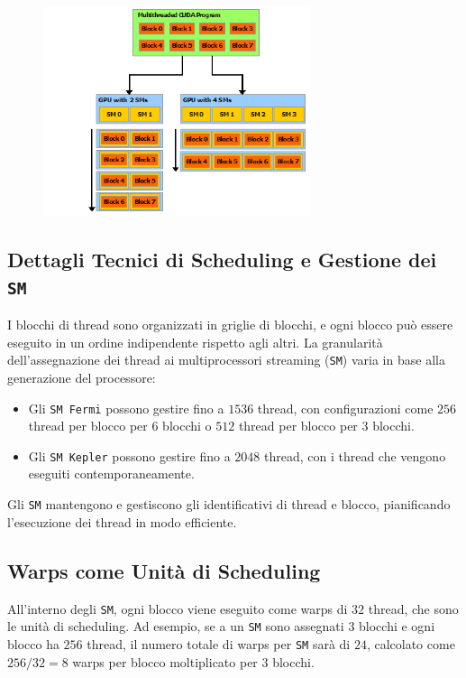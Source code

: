 \begin{figure}[H]
  \centering
  \includegraphics[width=0.7\textwidth]{img/transparent_scalability.png}
\end{figure}

\subsection{Dettagli Tecnici di Scheduling e Gestione dei \texttt{SM}}
I blocchi di thread sono organizzati in griglie di blocchi, e ogni blocco 
può essere eseguito in un ordine indipendente rispetto agli altri. 
La granularità dell'assegnazione dei thread ai multiprocessori 
streaming (\texttt{SM}) varia in base alla generazione del processore:
\begin{itemize}
    \item Gli \texttt{SM Fermi} possono gestire fino a $1536$ thread, 
    con configurazioni come $256$ thread per blocco per $6$ blocchi o $512$ thread per blocco per $3$ blocchi.
    \item Gli \texttt{SM Kepler} possono gestire fino a $2048$ thread, 
    con i thread che vengono eseguiti contemporaneamente.
\end{itemize}
Gli \texttt{SM} mantengono e gestiscono gli identificativi di thread 
e blocco, pianificando l'esecuzione dei thread in modo efficiente.

\subsection{Warps come Unità di Scheduling}
All'interno degli \texttt{SM}, ogni blocco viene eseguito come
warps di $32$ thread, che sono le unità di scheduling. Ad esempio,
se a un \texttt{SM} sono assegnati $3$ blocchi e ogni blocco ha
$256$ thread, il numero totale di warps per \texttt{SM} sarà di
$24$, calcolato come \(256/32 = 8\) warps per blocco moltiplicato 
per $3$ blocchi.

